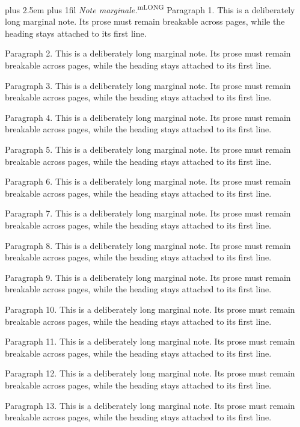 \documentclass[11pt]{article}
\makeatletter
\newcommand\LMnotelabel{Note marginale}
\newcommand\LMsourceid{}
\newif\ifLMtrial
\newcommand\LMcurrentnoteref{}
\newcommand\LMgetnoteref{\directlua{LM.noteref("\luaescapestring{\LMsourceid}")}}
\newcommand\LMmarginstyle{\footnotesize\rightskip=0pt plus 2.5em\relax\parfillskip=0pt plus 1fil\relax\hyphenpenalty=50\relax\def\margin##1{{[##1]}}}
\newcommand\LMtrial[2]{%
 \LMtrialtrue\directlua{LM.measure=true LM.maxw=0}%
 \setbox\LMmbox\vbox{\hsize=#1\relax\@parboxrestore\LMmarginstyle #2\par}%
 \LMtrialfalse\directlua{LM.measure=false tex.setdimen("LMmw",LM.maxw)}%
 \LMmh=\dimexpr\ht\LMmbox+\dp\LMmbox\relax}
\newcommand\LMinblock[1]{%
 \directlua{LM.blocknotes=LM.blocknotes+1}%
 \par\smallskip\noindent{\color{gray}\rule{.20\linewidth}{.35pt}}\par\nobreak
 \begingroup\LMmarginstyle\parindent=0pt\@beginparpenalty=10000\relax
 \noindent\textit{\LMnotelabel.}\enspace #1\par\endgroup\smallskip}
\newcommand\LMmargin[1]{\begingroup\LMgetnoteref
 \LMtrial{\marginparwidth}{#1}%
 \ifdim\LMmw>\marginparwidth\LMnotemark{\LMcurrentnoteref}\LMinblock{\textsuperscript{m\LMcurrentnoteref}\ #1}%
 \else\ifdim\LMmh>33pt\LMnotemark{\LMcurrentnoteref}\LMinblock{\textsuperscript{m\LMcurrentnoteref}\ #1}%
 \else\directlua{LM.shortnotes=LM.shortnotes+1}\marginpar{\LMmarginstyle #1}%
 \fi\fi\endgroup}
\newcommand\LMpendingnotes{}
\newcommand\LMnotemark[1]{\ifmmode{}^{\scriptscriptstyle\text{\color{gray}m#1}}\else\textsuperscript{\color{gray}m#1}\fi}
\newcommand\LMqueuenote[1]{%
 \LMgetnoteref\LMnotemark{\LMcurrentnoteref}%
 \ifnum\LMnotefresh=1\begingroup\edef\LMnext{\endgroup\noexpand\g@addto@macro\noexpand\LMpendingnotes{\noexpand\LMqueuednote{\LMcurrentnoteref}{\the\LMattr}{\unexpanded{#1}}}}\LMnext\fi}
\newcommand\LMqueuednote[3]{\begingroup\LMattr=#2\relax\ifnum#2>0\color{blue}\fi\LMinblock{\textsuperscript{m#1}\ #3}\endgroup}
\newcommand\margin[1]{\ifmmode\LMqueuenote{\(#1\)}\else\ifinner\LMqueuenote{#1}\else\LMmargin{#1}\fi\fi}
\makeatother
\begin{document}
\LMinblock{\textsuperscript{mLONG} Paragraph 1. This is a deliberately long marginal note. Its prose must remain breakable across pages, while the heading stays attached to its first line.\par
Paragraph 2. This is a deliberately long marginal note. Its prose must remain breakable across pages, while the heading stays attached to its first line.\par
Paragraph 3. This is a deliberately long marginal note. Its prose must remain breakable across pages, while the heading stays attached to its first line.\par
Paragraph 4. This is a deliberately long marginal note. Its prose must remain breakable across pages, while the heading stays attached to its first line.\par
Paragraph 5. This is a deliberately long marginal note. Its prose must remain breakable across pages, while the heading stays attached to its first line.\par
Paragraph 6. This is a deliberately long marginal note. Its prose must remain breakable across pages, while the heading stays attached to its first line.\par
Paragraph 7. This is a deliberately long marginal note. Its prose must remain breakable across pages, while the heading stays attached to its first line.\par
Paragraph 8. This is a deliberately long marginal note. Its prose must remain breakable across pages, while the heading stays attached to its first line.\par
Paragraph 9. This is a deliberately long marginal note. Its prose must remain breakable across pages, while the heading stays attached to its first line.\par
Paragraph 10. This is a deliberately long marginal note. Its prose must remain breakable across pages, while the heading stays attached to its first line.\par
Paragraph 11. This is a deliberately long marginal note. Its prose must remain breakable across pages, while the heading stays attached to its first line.\par
Paragraph 12. This is a deliberately long marginal note. Its prose must remain breakable across pages, while the heading stays attached to its first line.\par
Paragraph 13. This is a deliberately long marginal note. Its prose must remain breakable across pages, while the heading stays attached to its first line.\par
}
\end{document}
